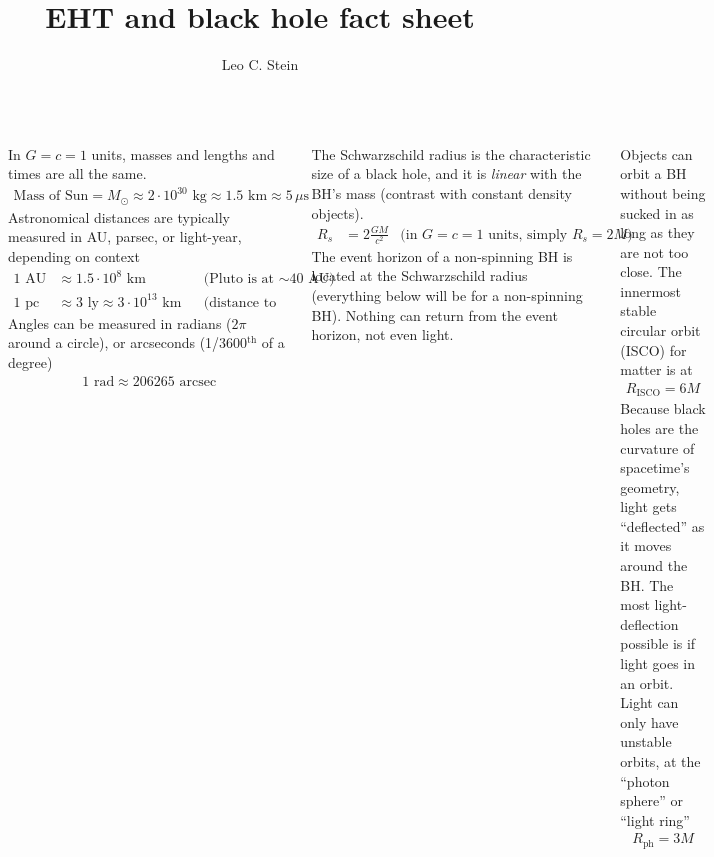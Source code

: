 \documentclass[25pt, a0paper, landscape]{tikzposter}
\title{EHT and black hole fact sheet}
\author{Leo C. Stein}
\begin{document}
\maketitle

\linespread{1.25}

\begin{columns}
    {
      In $G=c=1$ units, masses and lengths and times are all the same.
      \begin{align*}
        \text{Mass of Sun} = M_{\odot} \approx 2\cdot 10^{30} \text{ kg}
        \approx 1.5 \text{ km} \approx 5 \, \mu\text{s}
      \end{align*}
      Astronomical distances are typically measured in AU, parsec, or
      light-year, depending on context
      \begin{align*}
        1 \text{ AU} &\approx 1.5\cdot 10^8 \text{ km} && \text{(Pluto is at $\sim$40 AU)} \\
        1 \text{ pc} &\approx 3 \text{ ly} \approx 3\cdot 10^{13}\text{ km}	&&	\text{(distance to Alpha Cen is 1.3 pc)}
      \end{align*}
      Angles can be measured in radians ($2\pi$ around a circle), or
      arcseconds (1/3600$^{\text{th}}$ of a degree)
      \begin{align*}
        1 \text{ rad} \approx 206265 \text{ arcsec}
      \end{align*}

    }
    {\setlength{\parskip}{1cm plus 4mm minus 3mm}

      The Schwarzschild radius is the characteristic size of a black
      hole, and it is \emph{linear} with the BH’s mass (contrast with
      constant density objects).
        \begin{align*}
          R_{s} &= 2\frac{GM}{c^{2}} & \text{(in $G=c=1$ units, simply $R_s = 2M$)}
        \end{align*}
      The event horizon of a non-spinning BH is located at the
      Schwarzschild radius (everything below will be for a
      non-spinning BH). Nothing can return from the event horizon, not
      even light.

      Objects can orbit a BH without being sucked in as long as they
      are not too close. The innermost stable circular orbit (ISCO)
      for matter is at
      \begin{align*}
        R_{\text{ISCO}} = 6M
      \end{align*}
      Because black holes are the curvature of spacetime’s geometry,
      light gets ``deflected'' as it moves around the BH. The most
      light-deflection possible is if light goes in an orbit. Light
      can only have unstable orbits, at the ``photon sphere'' or
      ``light ring''
      \begin{align*}
        R_{\text{ph}} = 3M
      \end{align*}

}
\end{columns}
\end{document}
